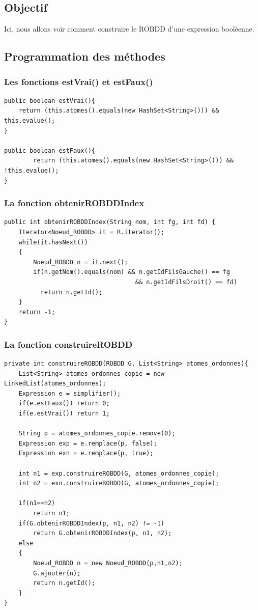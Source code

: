 \documentclass{article}
\begin{document}
\subsection{Objectif}
Ici, nous allons voir comment construire le ROBDD d'une expression booléenne.
\subsection{Programmation des méthodes}
\subsubsection{Les fonctions estVrai() et estFaux()}
\begin{verbatim}
public boolean estVrai(){
 	return (this.atomes().equals(new HashSet<String>())) && this.evalue();
}

public boolean estFaux(){
	 	return (this.atomes().equals(new HashSet<String>())) && !this.evalue();
}
\end{verbatim}
\subsubsection{La fonction obtenirROBDDIndex}
\begin{verbatim}
public int obtenirROBDDIndex(String nom, int fg, int fd) {
	Iterator<Noeud_ROBDD> it = R.iterator();
	while(it.hasNext())
	{
		Noeud_ROBDD n = it.next();
		if(n.getNom().equals(nom) && n.getIdFilsGauche() == fg 
                                    && n.getIdFilsDroit() == fd)
		  return n.getId();
	}
	return -1;
}
\end{verbatim}
\subsubsection{La fonction construireROBDD}
\begin{verbatim}
private int construireROBDD(ROBDD G, List<String> atomes_ordonnes){
	List<String> atomes_ordonnes_copie = new LinkedList(atomes_ordonnes);
	Expression e = simplifier();
	if(e.estFaux()) return 0;
	if(e.estVrai()) return 1;
	
	String p = atomes_ordonnes_copie.remove(0);
	Expression exp = e.remplace(p, false);
	Expression exn = e.remplace(p, true);
	
	int n1 = exp.construireROBDD(G, atomes_ordonnes_copie);
	int n2 = exn.construireROBDD(G, atomes_ordonnes_copie);
	
	if(n1==n2)
		return n1;
	if(G.obtenirROBDDIndex(p, n1, n2) != -1)
		return G.obtenirROBDDIndex(p, n1, n2);
	else
	{
		Noeud_ROBDD n = new Noeud_ROBDD(p,n1,n2);
		G.ajouter(n);
		return n.getId();
	}
}
\end{verbatim}
\end{document}
